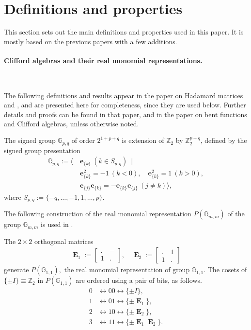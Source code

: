 \documentclass[12pt,a4paper]{article}
\newcommand{\mb}[1]{\mathbb{#1}}
\newcommand{\mf}[1]{\mathbf{#1}}
\newcommand{\oE}{\mf{\operatorname{E}}}
\newcommand{\G}{\mb{G}}
\newcommand{\Z}{\mb{Z}}
\newcommand{\Rep}{P}
\begin{document}
\section{Definitions and properties}
\label{sec-Preliminaries}
This section sets out the main definitions and properties used in this paper.
It is mostly based on the previous papers \cite{Leo14Constructions, Leo15Bent}
with a few additions.

\paragraph*{Clifford algebras and their real monomial representations.}
\label{sec-Clifford}

~

The following definitions and results appear in the paper on Hada\-mard matrices and  \cite{Leo14Constructions},
and are presented here for completeness, since they are used below. 
Further details and proofs can be found in that paper, and in the paper on bent functions and Clifford algebras,
unless otherwise noted.

The signed group
$\G_{p,q}$ of order $2^{1+p+q}$ 
is extension of $\Z_2$ by $\Z_2^{p+q}$,
defined by the signed group presentation
%
\begin{align*}
\G_{p,q} := \bigg\langle \ 
&\mf{e}_{\{k\}}\ (k \in S_{p,q})\ \mid
\\
&\mf{e}_{\{k\}}^2 = -1\ (k < 0), \quad \mf{e}_{\{k\}}^2 = 1\ (k > 0),
\\
&\mf{e}_{\{j\}}\mf{e}_{\{k\}} = -\mf{e}_{\{k\}}\mf{e}_{\{j\}}\ (j \neq k) \bigg\rangle,
\end{align*}
%
where $S_{p,q} := \{-q,\ldots,-1,1,\ldots,p\}.$

The following construction of the real monomial representation $\Rep(\G_{m,m})$
of the group $\G_{m,m}$ is used in \cite{Leo14Constructions}.

The $2 \times 2$ orthogonal matrices
\begin{align*}
\oE_1 :=
\left[
\begin{array}{cc}
. & - \\
1 & .
\end{array}
\right],
\quad
\oE_2 :=
\left[
\begin{array}{cc}
. & 1 \\
1 & .
\end{array}
\right]
\end{align*}
generate $\Rep(\G_{1,1}),$ the real monomial representation of group $\G_{1,1}.$
The cosets of $\{\pm I\} \equiv \Z_2$ in $\Rep(\G_{1,1})$ are
ordered using a pair of bits, as follows.
\begin{align*}
0 &\leftrightarrow 00 \leftrightarrow \{ \pm I \},
\\
1 &\leftrightarrow 01 \leftrightarrow \{ \pm \oE_1 \},
\\
2 &\leftrightarrow 10 \leftrightarrow \{ \pm \oE_2 \},
\\
3 &\leftrightarrow 11 \leftrightarrow \{ \pm \oE_1 \oE_2 \}.
\end{align*}
\end{document}
